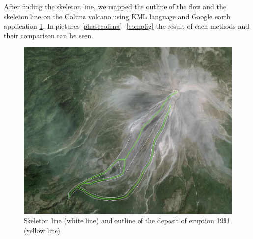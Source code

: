 \documentclass[letterpaper,10pt]{article}
\begin{document}

After finding the skeleton line, we mapped the outline of the flow and the skeleton line on the Colima volcano 
using KML language and Google earth application \ref{skel_outline}. In pictures \ref{phasecolima}- \ref{compfig} the result of each methods and their comparison can be seen. 

\begin{figure}[H]
\centerline{\includegraphics[width=.35\textwidth]{IMAGES/skeleton_outline1.jpg}}
\caption{Skeleton line (white line) and outline of the deposit of eruption 1991 (yellow line)}
\label{skel_outline}
\end{figure}
\end{document}
